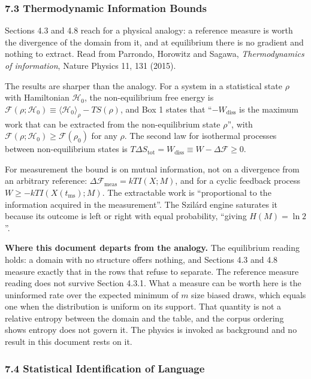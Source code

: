 \subsubsection{7.3 Thermodynamic Information Bounds}

Sections 4.3 and 4.8 reach for a physical analogy: a reference measure is worth the divergence of the domain from it, and at equilibrium there is no gradient and nothing to extract. Read from Parrondo, Horowitz and Sagawa, \emph{Thermodynamics of information}, Nature Physics 11, 131 (2015).

The results are sharper than the analogy. For a system in a statistical state \(\rho\) with Hamiltonian \(\mathcal{H}_0\), the non-equilibrium free energy is \(\mathcal{F}(\rho;\mathcal{H}_0) \equiv \langle \mathcal{H}_0\rangle_\rho - TS(\rho)\), and Box 1 states that ``\(-W_{\text{diss}}\) is the maximum work that can be extracted from the non-equilibrium state \(\rho\)'', with \(\mathcal{F}(\rho;\mathcal{H}_0) \ge \mathcal{F}(\rho_0)\) for any \(\rho\). The second law for isothermal processes between non-equilibrium states is \(T\Delta S_{\text{tot}} = W_{\text{diss}} \equiv W - \Delta\mathcal{F} \ge 0\).

For measurement the bound is on mutual information, not on a divergence from an arbitrary reference: \(\Delta \mathcal{F}_{\text{meas}} = kTI(X;M)\), and for a cyclic feedback process \(W \ge -kTI(X(t_{\text{ms}});M)\). The extractable work is ``proportional to the information acquired in the measurement''. The Szilárd engine saturates it because its outcome is left or right with equal probability, ``giving \(H(M) = \ln 2\)''.

\noindent\textbf{Where this document departs from the analogy.} The equilibrium reading holds: a domain with no structure offers nothing, and Sections 4.3 and 4.8 measure exactly that in the rows that refuse to separate. The reference measure reading does not survive Section 4.3.1. What a measure can be worth here is the uninformed rate over the expected minimum of \(m\) size biased draws, which equals one when the distribution is uniform on its support. That quantity is not a relative entropy between the domain and the table, and the corpus ordering shows entropy does not govern it. The physics is invoked as background and no result in this document rests on it.

\subsubsection{7.4 Statistical Identification of Language}

